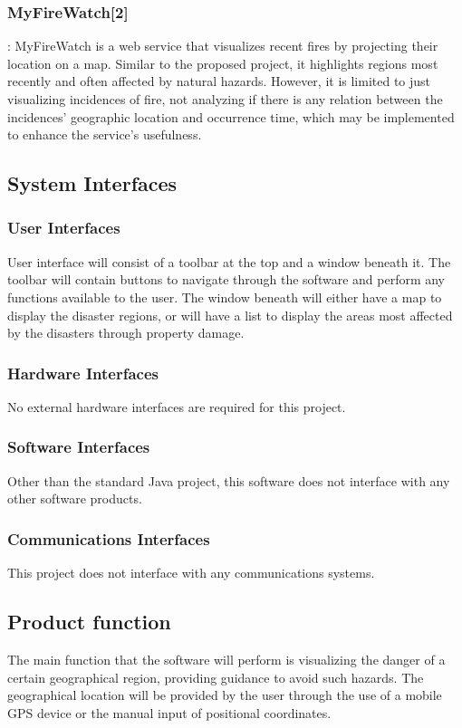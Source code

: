 \documentclass{article}
\begin{document}
\subsubsection*{MyFireWatch[2]} :
    MyFireWatch is a web service that visualizes recent fires by projecting their 
    location on a map. Similar to the proposed project, it highlights regions most 
    recently and often affected by natural hazards. However, it is limited to just 
    visualizing incidences of fire, not analyzing if there is any relation between 
    the incidences’ geographic location and occurrence time, which may be implemented 
    to enhance the service’s usefulness.

 
    \subsection{System Interfaces}
	\subsubsection{User Interfaces}
    User interface will consist of a toolbar at the top and a window beneath it. 
    The toolbar will contain buttons to navigate through the software and perform 
    any functions available to the user. The window beneath will either have a map to 
    display the disaster regions, or will have a list to display the areas most 
    affected by the disasters through property damage.
 
	\subsubsection{Hardware Interfaces}
		No external hardware interfaces are required for this project.
 
	\subsubsection{Software Interfaces}
        Other than the standard Java project, this software does not 
        interface with any other software products.
 
	\subsubsection{Communications Interfaces}
		This project does not interface with any communications systems.
 
    \subsection{Product function}
        The main function that the software will perform is visualizing the 
        danger of a certain geographical region, providing guidance to avoid such 
        hazards. The geographical location will be provided by the user through the use 
        of a mobile GPS device or the manual input of positional coordinates.   
         
\end{document}
